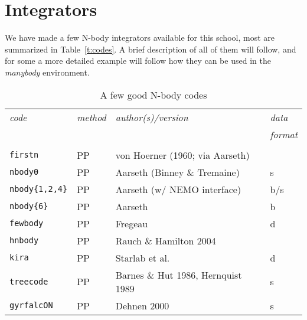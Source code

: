 \chapter                {Integrators}

We have made a few N-body integrators available for this school, most 
are summarized
in Table~\ref{t:codes}. A brief description of all of them will follow, and 
for some a more detailed example will follow how they
can be used in the {\it manybody} environment. 




\begin{center}
\begin{table}[h]
\caption{A few good N-body codes}
\begin{tabular}{||l|l|l|l||}

\hline 
{\it code} & {\it method} & {\it author(s)/version}  & {\it data} \\
       &&& {\it format} \\
\hline &&& \\

{\tt firstn} & PP & von Hoerner (1960; via Aarseth)  & \\

{\tt nbody0} & PP & Aarseth (Binney \& Tremaine) & s \\

{\tt nbody\{1,2,4\}} & PP & Aarseth (w/ NEMO interface) & b/s\\

{\tt nbody\{6\}} & PP &  Aarseth  & b \\

{\tt fewbody} & PP & Fregeau   & d \\

{\tt hnbody}  & PP & Rauch \& Hamilton 2004 & \\

{\tt kira} & PP & Starlab et al. & d \\

{\tt treecode} & PP & Barnes \& Hut 1986, Hernquist 1989 & s \\

{\tt gyrfalcON} & PP & Dehnen 2000 & s \\



\end{tabular}
\end{table}
\end{center}
